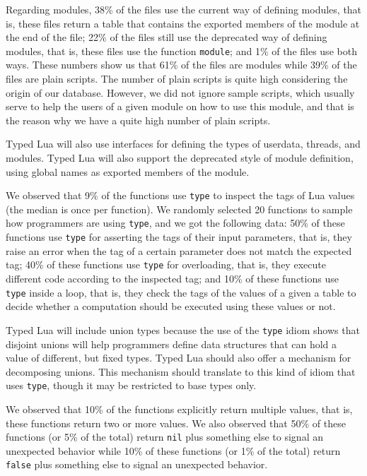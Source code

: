\documentclass[preprint]{sig-alternate}
\begin{document}
Regarding modules, 38\% of the files use the current way of defining
modules, that is, these files return a table that contains the
exported members of the module at the end of the file;
22\% of the files still use the deprecated way of defining modules,
that is, these files use the function \verb'module';
and 1\% of the files use both ways.
These numbers show us that 61\% of the files are modules while 39\%
of the files are plain scripts.
The number of plain scripts is quite high considering the origin of
our database.
However, we did not ignore sample scripts, which usually serve to
help the users of a given module on how to use this module, and
that is the reason why we have a quite high number of plain scripts.

Typed Lua will also use interfaces for defining the types of
userdata, threads, and modules.
Typed Lua will also support the deprecated style of module definition,
using global names as exported members of the module.

We observed that 9\% of the functions use \verb'type' to inspect the
tags of Lua values (the median is once per function).
We randomly selected 20 functions to sample how programmers are
using \verb'type', and we got the following data:
50\% of these functions use \verb'type' for asserting the tags of
their input parameters, that is, they raise an error when the tag of a
certain parameter does not match the expected tag;
40\% of these functions use \verb'type' for overloading, that is,
they execute different code according to the inspected tag;
and 10\% of these functions use \verb'type' inside a loop, that is,
they check the tags of the values of a given a table to decide
whether a computation should be executed using these values or not.

Typed Lua will include union types because the use of the \verb'type'
idiom shows that disjoint unions will help programmers define
data structures that can hold a value of different, but fixed types.
Typed Lua should also offer a mechanism for decomposing unions.
This mechanism should translate to this kind of idiom that uses
\verb'type', though it may be restricted to base types only.

We observed that 10\% of the functions explicitly return multiple
values, that is, these functions return two or more values.
We also observed that 50\% of these functions (or 5\% of the total)
return \verb'nil' plus something else to signal an unexpected
behavior while 10\% of these functions (or 1\% of the total) return
\verb'false' plus something else to signal an unexpected behavior.
\end{document}
